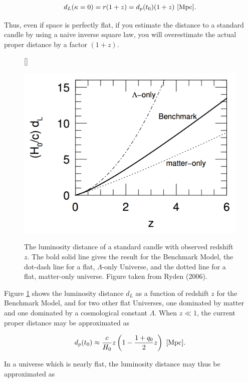 \documentclass[a4paper,11pt]{article}
\begin{document}
\begin{align*}
    d_L(\kappa=0) = r(1+z) = d_p(t_0)(1+z) ~ [{\rm Mpc}].
\end{align*}

{\noindent}Thus, even if space is perfectly flat, if you estimate the distance to a standard candle by using a naive inverse square law, you will overestimate the actual proper distance by a factor $(1 + z)$.

\begin{figure}[h]
    [\FBwidth]
    {\caption{\footnotesize{The luminosity distance of a standard candle with observed redshift $z$. The bold solid line gives the result for the Benchmark Model, the dot-dash line for a flat, $\Lambda$-only Universe, and the dotted line for a flat, matter-only universe. Figure taken from Ryden (2006).}}
    \label{fig:luminositydistance}}
    {\includegraphics[width=12cm]{figures/LuminosityDistance.png}}
\end{figure}

{\noindent}Figure \ref{fig:luminositydistance} shows the luminosity distance $d_L$ as a function of redshift $z$ for the Benchmark Model, and for two other flat Universes, one dominated by matter and one dominated by a cosmological constant $\Lambda$. When $z \ll 1$, the current proper distance may be approximated as

\begin{align*}
    d_p(t_0) \approx \frac{c}{H_0}z \left(1-\frac{1+q_0}{2}z\right) ~ [{\rm Mpc}].
\end{align*}

{\noindent}In a universe which is nearly flat, the luminosity distance may thus be approximated as
\end{document}
